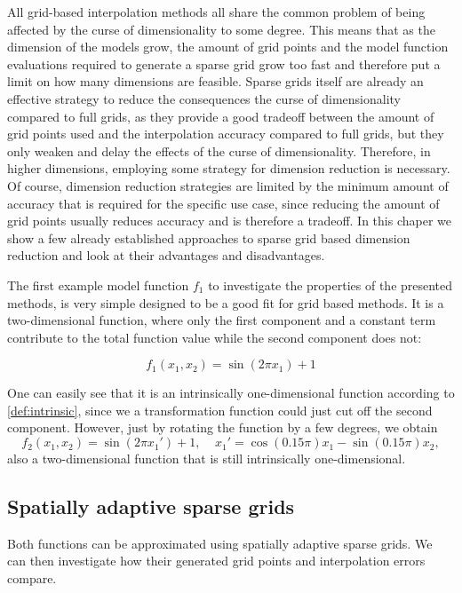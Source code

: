 \documentclass[
  a4paper,  %
  twoside,  %
  bibliography=totoc,
  headsepline,
  cleardoublepage=empty,
  parskip=half,
  draft=false
]{scrbook}
\begin{document}
All grid-based interpolation methods all share the common problem of being affected by the curse of dimensionality to some degree.
This means that as the dimension of the models grow, the amount of grid points and the model function evaluations required to generate a sparse grid grow too fast and therefore put a limit on how many dimensions are feasible.
Sparse grids itself are already an effective strategy to reduce the consequences the curse of dimensionality compared to full grids, as they provide a good tradeoff between the amount of grid points used and the interpolation accuracy compared to full grids, but they only weaken and delay the effects of the curse of dimensionality.
Therefore, in higher dimensions, employing some strategy for dimension reduction is necessary.
Of course, dimension reduction strategies are limited by the minimum amount of accuracy that is required for the specific use case, since reducing the amount of grid points usually reduces accuracy and is therefore a tradeoff.
In this chaper we show a few already established approaches to sparse grid based dimension reduction and look at their advantages and disadvantages.

The first example model function $f_1$ to investigate the properties of the presented methods, is very simple designed to be a good fit for grid based methods.
It is a two-dimensional function, where only the first component and a constant term contribute to the total function value while the second component does not:

\begin{equation}
f_1(x_1, x_2)=\sin(2 \pi x_1) + 1
\nonumber
\end{equation}

One can easily see that it is an intrinsically one-dimensional function according to \cref{def:intrinsic}, since we a transformation function could just cut off the second component.
However, just by rotating the function by a few degrees, we obtain
\begin{equation}
f_2(x_1,x_2)=\sin(2 \pi x_1') + 1, ~~~~~ x_1'=\cos(0.15 \pi) x_1 -\sin(0.15 \pi) x_2,
\end{equation}
also a two-dimensional function that is still intrinsically one-dimensional.

\subsection{Spatially adaptive sparse grids}

Both functions can be approximated using spatially adaptive sparse grids.
We can then investigate how their generated grid points and interpolation errors compare.
\end{document}
